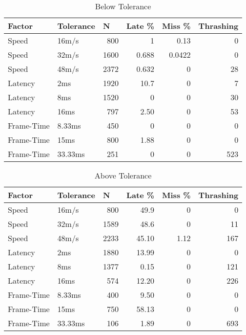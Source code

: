 \begin{table}
	\centering
	\begin{tabular}{llrrrr}
		\toprule
		\multicolumn{1}{l}{Factor} & \multicolumn{1}{l}{Tolerance} & \multicolumn{1}{l}{N} & \multicolumn{1}{l}{Late \%} & \multicolumn{1}{l}{Miss \%} & \multicolumn{1}{l}{Thrashing}  \\ 
		\hline
		Speed      & 16m/s     & 800  & 1     & 0.13       &    0             \\
		Speed      & 32m/s     & 1600 & 0.688 & 0.0422     &    0             \\
		Speed      & 48m/s     & 2372  & 0.632& 0          &    28            \\
		Latency    & 2ms       & 1920  & 10.7 & 0          &    7             \\
		Latency    & 8ms       & 1520  & 0    & 0          &    30            \\
		Latency    & 16ms      & 797  & 2.50  & 0          &    53            \\
		Frame-Time & 8.33ms    & 450  & 0     & 0          &    0             \\
		Frame-Time & 15ms      & 800  & 1.88  & 0          &    0             \\
		Frame-Time & 33.33ms   & 251  & 0     & 0          &    523           \\
		\bottomrule
	\end{tabular}
	\caption{Below Tolerance}
	\label{tab_BelowTolerance}
\end{table}

\begin{table}
	\centering
	\begin{tabular}{llrrrr}
		\toprule
		\multicolumn{1}{l}{Factor} & \multicolumn{1}{l}{Tolerance} & \multicolumn{1}{l}{N} & \multicolumn{1}{l}{Late \%} & \multicolumn{1}{l}{Miss \%} & \multicolumn{1}{l}{Thrashing}  \\ 
		\hline
		Speed      & 16m/s     & 800  &   49.9  & 0           & 0               \\
		Speed      & 32m/s     & 1589  &  48.6  & 0           & 11              \\
		Speed      & 48m/s     & 2233  &  45.10 & 1.12        & 167             \\
		Latency    & 2ms       & 1880  &  13.99 & 0           & 0               \\
		Latency    & 8ms       & 1377  &  0.15  & 0           & 121             \\
		Latency    & 16ms      & 574  &   12.20 & 0           & 226             \\
		Frame-Time & 8.33ms    & 400  &   9.50  & 0           & 0               \\
		Frame-Time & 15ms      & 750  &   58.13 & 0           & 0               \\
		Frame-Time & 33.33ms   & 106  &   1.89  & 0           & 693             \\
		\bottomrule
	\end{tabular}
	\caption{Above Tolerance}
	\label{tab_AboveTolerance}
\end{table}

